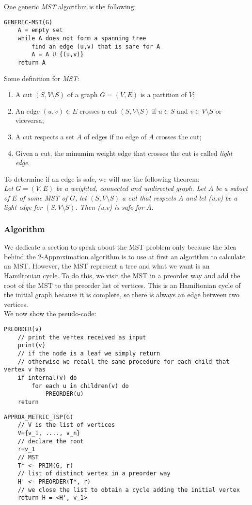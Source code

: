 \noindent
One generic \textit{MST} algorithm is the following: 
\begin{verbatim}
GENERIC-MST(G)
    A = empty set
    while A does not form a spanning tree
        find an edge (u,v) that is safe for A
        A = A U {(u,v)}
    return A
\end{verbatim}
\noindent
Some definition for \textit{MST}:
\begin{enumerate}
    \item A cut $(S, V \setminus S)$ of a graph $G = (V, E)$ is a partition of $V$;
    \item An edge $(u,v) \in E$ crosses a cut $(S, V \setminus S)$ if $u\in S$ and $v \in V \setminus S$ or viceversa;
    \item A cut respects a set $A$ of edges if no edge of $A$ crosses the cut;
    \item Given a cut, the minumim weight edge that crosses the cut is called \textit{light edge}.
\end{enumerate}
\noindent
To determine if an edge is safe, we will use the following theorem: \\

\noindent
\textit{Let $G = (V,E)$ be a weighted, connected and undirected graph. Let $A$ be a subset of $E$ of some \textit{MST} of $G$, let $(S, V \setminus S)$ a cut that respects $A$ and let (u,v) be a light edge for $(S, V \setminus S)$. Then (u,v) is safe for $A$}.

\subsubsection{Algorithm}
We dedicate a section to speak about the MST problem only because the idea behind the 2-Approximation algorithm is to use at first an algorithm to calculate an MST. However, the MST represent a tree and what we want is an Hamiltonian cycle. To do this, we visit the MST in a preorder way and add the root of the MST to the preorder list of vertices. This is an Hamiltonian cycle of the initial graph because it is complete, so there is always an edge between two vertices.\\
We now show the pseudo-code:
\begin{verbatim}
PREORDER(v)
    // print the vertex received as input
    print(v)
    // if the node is a leaf we simply return
    // otherwise we recall the same procedure for each child that vertex v has
    if internal(v) do
        for each u in children(v) do
            PREORDER(u)
    return
\end{verbatim}
\begin{verbatim}
APPROX_METRIC_TSP(G)
    // V is the list of vertices
    V={v_1, ...., v_n}
    // declare the root
    r=v_1
    // MST
    T* <- PRIM(G, r)
    // list of distinct vertex in a preorder way
    H' <- PREORDER(T*, r)
    // we close the list to obtain a cycle adding the initial vertex
    return H = <H', v_1>
\end{verbatim}

